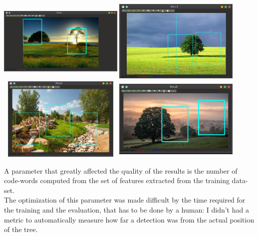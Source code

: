 \documentclass[]{report}
\begin{document}
\begin{center}
\includegraphics[width=6cm, height=4cm]{before/no_prep_0_48_0}
\includegraphics[width=6cm,height=4cm]{img/before/no_prep_0_48_1}
\includegraphics[width=6cm,height=4cm]{img/before/no_prep_0_48_2}
\includegraphics[width=6cm,height=4cm]{img/before/no_prep_0_48_5}
\end{center}

\vspace{0.5cm}

A parameter that greatly affected the quality of the results is the number of code-words computed from the set of features extracted from the training data-set. \\
The optimization of this parameter was made difficult by the time required for the training and the evaluation, that has to be done by a human: I didn't had a metric to automatically measure how far a detection was from the actual position of the tree.
\end{document}
